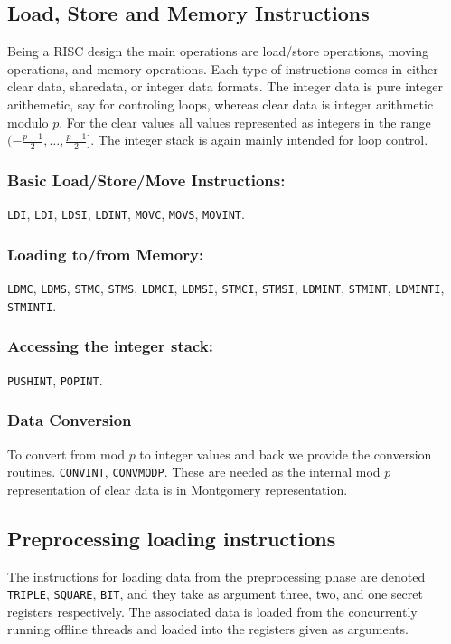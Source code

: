 \subsection{Load, Store and Memory Instructions}
Being a RISC design the main operations are load/store
operations, moving operations, and memory operations.
Each type of instructions comes in either clear data, 
sharedata, or integer data formats. 
The integer data is pure integer arithemetic, say
for controling loops, whereas clear data is integer
arithmetic modulo $p$.
For the clear values all values represented as integers 
in the range $(-\frac{p-1}{2}, \dots, \frac{p-1}{2}]$.
The integer stack is again mainly intended for loop
control.

\subsubsection{Basic Load/Store/Move Instructions:}
\verb+LDI+,
\verb+LDI+,
\verb+LDSI+,
\verb+LDINT+,
\verb+MOVC+,
\verb+MOVS+,
\verb+MOVINT+.

\subsubsection{Loading to/from Memory:}
 \verb+LDMC+,
 \verb+LDMS+,
 \verb+STMC+,
 \verb+STMS+,
 \verb+LDMCI+,
 \verb+LDMSI+,
 \verb+STMCI+,
 \verb+STMSI+,
 \verb+LDMINT+, 
 \verb+STMINT+,
 \verb+LDMINTI+,
 \verb+STMINTI+.

\subsubsection{Accessing the integer stack:}
\verb+PUSHINT+, \verb+POPINT+.

\subsubsection{Data Conversion}
To convert from mod $p$ to integer values and
back we provide the conversion routines.
\verb+CONVINT+, \verb+CONVMODP+.
These are needed as the internal mod $p$ representation
of clear data is in Montgomery representation.

\subsection{Preprocessing loading instructions}
The instructions for loading data from the preprocessing phase
are denoted \verb+TRIPLE+, \verb+SQUARE+, \verb+BIT+,
and they take as argument three, two, and one secret registers 
respectively.
The associated data is loaded from the concurrently running
offline threads and loaded into the registers given as arguments.

